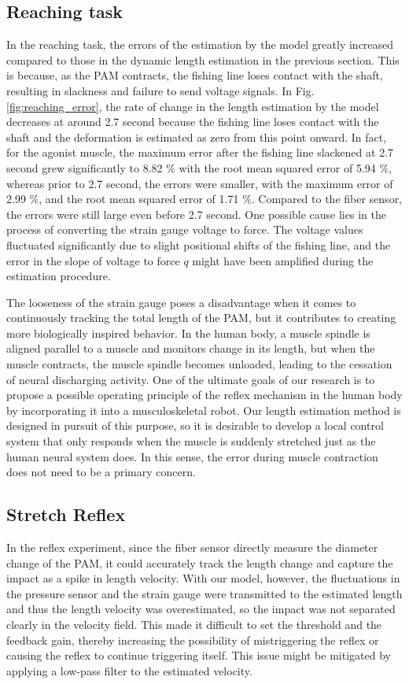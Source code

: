 \subsection{Reaching task}
In the reaching task, the errors of the estimation by the model greatly increased compared to those in the dynamic length estimation in the previous section. This is because, as the PAM contracts, the fishing line loses contact with the shaft, resulting in slackness and failure to send voltage signals. In Fig.\ref{fig:reaching_error}, the rate of change in the length estimation by the model decreases at around 2.7 second because the fishing line loses contact with the shaft and the deformation is estimated as zero from this point onward. In fact, for the agonist muscle, the maximum error after the fishing line slackened at 2.7 second grew significantly to 8.82 $\%$ with the root mean squared error of 5.94 $\%$, whereas prior to 2.7 second, the errors were smaller, with the maximum error of 2.99 $\%$, and the root mean squared error  of 1.71 $\%$. Compared to the fiber sensor, the errors were still large even before 2.7 second. One possible cause lies in the process of converting the strain gauge voltage to force. The voltage values fluctuated significantly due to slight positional shifts of the fishing line, and the error in the slope of voltage to force $q$ might have been amplified during the estimation procedure.

The looseness of the strain gauge poses a disadvantage  when it comes to continuously tracking the total length of the PAM, but it contributes to creating more biologically inspired behavior. In the human body, a muscle spindle is aligned parallel to a muscle and monitors change in its length, but when the muscle contracts, the muscle spindle becomes unloaded, leading to the cessation of neural discharging activity\cite{spindle}. One of the ultimate goals of our research is to propose a possible operating principle of the reflex mechanism in the human body by incorporating it into a musculoskeletal robot. Our length estimation method is designed in pursuit of this purpose, so it is desirable to develop a local control system that only responds when the muscle is suddenly stretched just as the human neural system does. In this sense, the error during muscle contraction does not need to be a primary concern.

\subsection{Stretch Reflex}
In the reflex experiment, since the fiber sensor directly measure the diameter change of the PAM, it could accurately track the length change and capture the impact as a spike in length velocity. With our model, however, the fluctuations in the pressure sensor and the strain gauge were transmitted to the estimated length and thus the length velocity was overestimated, so the impact was not separated clearly in the velocity field. This made it difficult to set the threshold and the feedback gain, thereby increasing the possibility of mistriggering the reflex or causing the reflex to continue triggering itself. This issue might be mitigated by applying a low-pass filter to the estimated velocity.

